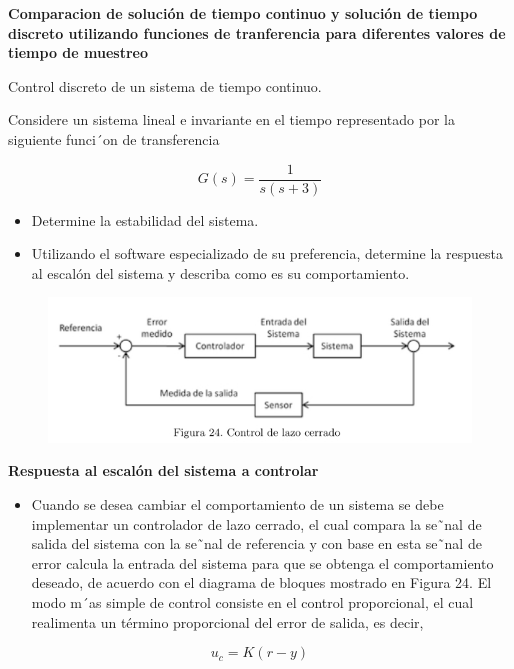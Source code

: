 \textbf{Comparacion de solución de tiempo continuo y solución de tiempo discreto utilizando funciones de tranferencia para diferentes valores de tiempo de muestreo }

{\Large Control discreto de un sistema de tiempo continuo.}

Considere un sistema lineal e invariante en el tiempo representado por la siguiente funci´on de transferencia

\begin{equation*}
	G(s)=\frac{1}{s(s+3)}
\end{equation*}

\begin{itemize}
	\item Determine la estabilidad del sistema.
	\item Utilizando el software especializado de su preferencia, determine la respuesta al escalón del sistema y describa como es su comportamiento.
\end{itemize}

\begin{figure}[H]
	\centering
	\includegraphics[scale=0.7]{img2/fig24}
	\label{fig:fig24}
\end{figure}

\textbf{Respuesta al escalón del sistema a controlar}

\begin{itemize}
	\item Cuando se desea cambiar el comportamiento de un sistema se debe implementar un controlador de lazo
	cerrado, el cual compara la se˜nal de salida del sistema con la se˜nal de referencia y con base en esta se˜nal
	de error calcula la entrada del sistema para que se obtenga el comportamiento deseado, de acuerdo con
	el diagrama de bloques mostrado en Figura 24. El modo m´as simple de control consiste en el control
	proporcional, el cual realimenta un término proporcional del error de salida, es decir,
\end{itemize}

\begin{equation*}
	u_c=K(r-y)
\end{equation*}

